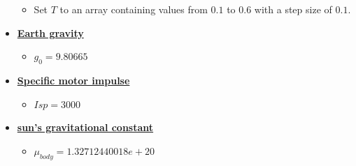 \documentclass{article}
\begin{document}
\begin{algorithm}[H]
\begin{algorithmic}
\begin{itemize}[]
				\begin{itemize}
					\item Set $T$ to an array containing values from $0.1$ to $0.6$ with a step size of $0.1$.
				\end{itemize}
				\item \textbf{\underline{Earth gravity}}
				\begin{itemize}
					\item $g_0 = 9.80665$
				\end{itemize}
				\item \textbf{\underline{Specific motor impulse}}
				\begin{itemize}
					\item $Isp = 3000$
				\end{itemize}
				\item \textbf{\underline{sun's gravitational constant}}
				\begin{itemize}
					\item $\mu_{body} = 1.32712440018e+20$
				\end{itemize}
			\end{itemize}
		\end{algorithmic}
	\end{algorithm}
	
	
\end{document}

